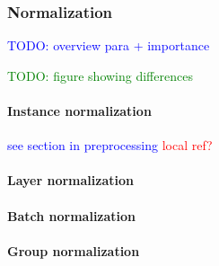 

\subsubsection{Normalization}

\textcolor{blue}{TODO: overview para + importance}

\textcolor{green}{TODO: figure showing differences}

\paragraph{Instance normalization}

\textcolor{blue}{see section in preprocessing \textcolor{red}{local ref?}}

\paragraph{Layer normalization}

\paragraph{Batch normalization}

\paragraph{Group normalization}